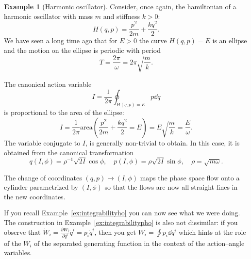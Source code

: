 \documentclass[english,fontsize=11pt,paper=b5]{scrbook}
\theoremstyle{definition}
\newtheorem{example}{Example}[chapter]
\begin{document}
      \begin{example}[Harmonic oscillator]
        Consider, once again, the hamiltonian of a harmonic oscillator with mass $m$ and stiffness $k>0$:
        \begin{equation}
          H(q,p) = \frac{p^2}{2m} + \frac{k q^2}{2}.
        \end{equation}
        We have seen a long time ago that for $E>0$ the curve $H(q,p) = E$ is an ellipse and the motion on the ellipse is periodic with period
        \begin{equation}
          T = \frac{2\pi}{\omega} = 2\pi \sqrt{\frac{m}{k}}.
        \end{equation}

        The canonical action variable
        \begin{equation}
          I = \frac1{2\pi}\oint_{H(q,p) = E} p \dd q
        \end{equation}
        is proportional to the area of the ellipse:
        \begin{equation}
          I = \frac1{2\pi} \mathrm{area}\left(\frac{p^2}{2m} + \frac{k q^2}{2} = E\right) = E \sqrt{\frac{m}{k}} = \frac E \omega.
        \end{equation}
        The variable conjugate to $I$, is generally non-trivial to obtain. In this case, it is obtained from the canonical transformation
        \begin{equation}
          q(I, \phi) = \rho^{-1} \sqrt{2I} \cos\phi, \quad
          p(I, \phi) = \rho \sqrt{2I} \sin\phi, \quad
          \rho = \sqrt{m \omega}.
        \end{equation}

        The change of coordinates $(q,p) \mapsto (I, \phi)$ maps the phase space flow onto a cylinder parametrized by $(I, \phi)$ so that the flows are now all straight lines in the new coordinates.

        If you recall Example~\ref{ex:integrabilityho} you can now see what we were doing.
        The construction in Example~\ref{ex:integrabilitypho} is also not dissimilar: if you observe that $\dot W_i = \frac{\partial W_i}{\partial q^i} \dot q^i = p_i \dot q^i$, then you get $W_i = \oint p_i\dd q^i$ which hints at the role of the $W_i$ of the separated generating function in the context of the action--angle variables.
      \end{example}
\end{document}
